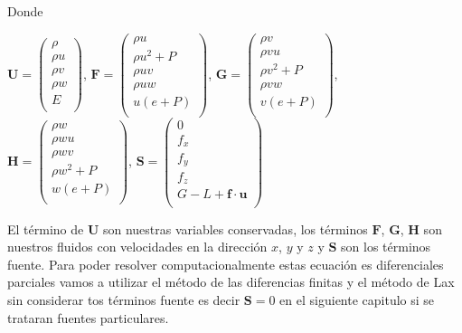 \documentclass[12pt,a4paper]{book}
\begin{document}
Donde
\begin{center}


$\mathbf{U}=
\left(\begin{smallmatrix}
\rho \\
\rho u \\
\rho v \\
\rho w \\
E \\
\end{smallmatrix}\right)
$,
$\mathbf{F} =
\left(\begin{smallmatrix}
\rho u \\
\rho u^{2}+P \\
\rho uv \\
\rho uw \\
u(e+P) \\
\end{smallmatrix}\right)
$,
$\mathbf{G} =
\left(\begin{smallmatrix}
\rho v\\
\rho vu \\
\rho v^{2}+P \\
\rho vw \\
v(e+P) \\
\end{smallmatrix}\right)
$,
$\mathbf{H} =
\left(\begin{smallmatrix}
\rho w\\
\rho wu \\
\rho wv \\
\rho w^{2}+P \\
w(e+P) \\
\end{smallmatrix}\right)
$, 
$\mathbf{S} =
\left(\begin{smallmatrix}
0 \\
f_{x} \\
f_{y} \\
f_{z} \\
G-L+\textbf{f} \cdot \textbf{u} \\
\end{smallmatrix}\right)
$
\end{center}

El término de $\mathbf{U}$ son nuestras variables conservadas, los términos $\mathbf{F}$, $\mathbf{G}$, $\mathbf{H}$ son nuestros fluidos  con velocidades en la dirección $x$, $y$ y $z$ y $\mathbf{S}$ son los términos fuente. Para poder resolver computacionalmente estas ecuación  es diferenciales parciales vamos a utilizar el método de las diferencias finitas y el método de Lax sin considerar tos términos fuente es decir $\mathbf{S}=0$ en el siguiente capitulo si se trataran fuentes particulares.
\end{document}
